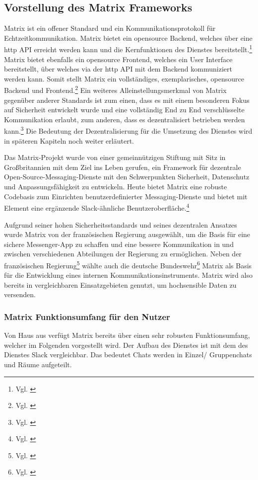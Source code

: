 \subsection{Vorstellung des Matrix Frameworks}\label{chapter:vdmf}
Matrix ist ein offener Standard und ein Kommunikationsprotokoll für  Echtzeitkommunikation. Matrix bietet ein opensource Backend, welches über eine http API erreicht werden kann und die Kernfunktionen des Dienstes bereitstellt.\footnote{Vgl. \cite{Matrix.org2020}} Matrix bietet ebenfalls ein opensource Frontend, welches ein User Interface bereitstellt, über welches via der http API mit dem Backend kommuniziert werden kann. Somit stellt Matrix ein vollständiges, exemplarisches, opensource Backend und Frontend.\footnote{Vgl. \cite{Github2020}} 
Ein weiteres Alleinstellungsmerkmal von Matrix gegenüber anderer Standards ist zum einen, dass es mit einem besonderen Fokus auf Sicherheit entwickelt wurde und eine vollständig End zu End verschlüsselte Kommunikation  erlaubt, zum anderen, dass es dezentralisiert betrieben werden kann.\footnote{Vgl. \cite{Nccgroup2016}} Die Bedeutung der Dezentralisierung für die Umsetzung des Dienstes wird in späteren Kapiteln noch weiter erläutert.

Das Matrix-Projekt wurde von einer gemeinnützigen Stiftung mit Sitz in Großbritannien mit dem Ziel ins Leben gerufen, ein Framework für dezentrale Open-Source-Messaging-Dienste mit den Schwerpunkten Sicherheit, Datenschutz und Anpassungsfähigkeit zu entwickeln. Heute bietet Matrix eine robuste Codebasis zum Einrichten benutzerdefinierter Messaging-Dienste und bietet mit Element eine ergänzende Slack-ähnliche Benutzeroberfläche.\footnote{Vgl. \cite{Matrix.org2020}}

Aufgrund seiner hohen Sicherheitsstandards und seines dezentralen Ansatzes wurde Matrix  von der französischen Regierung ausgewählt, um die Basis für eine sichere Messenger-App zu schaffen und eine bessere Kommunikation in und zwischen verschiedenen Abteilungen der Regierung zu ermöglichen. Neben der französischen Regierung\footnote{Vgl. \cite{Republique-Francaise2018}} wählte auch die deutsche Bundeswehr\footnote{Vgl. \cite{Weiss2020}} Matrix als Basis für die Entwicklung eines internen Kommunikationsinstruments. Matrix wird also bereits in vergleichbaren Einsatzgebieten genutzt, um hochsensible Daten zu versenden.

\subsubsection{Matrix Funktionsumfang für den Nutzer}\label{chapter:aemn}
Von Haus aus verfügt Matrix bereits über einen sehr robusten Funktionsumfang, welcher im Folgenden vorgestellt wird.
Der Aufbau des Dienstes ist mit dem des Dienstes Slack vergleichbar. Das bedeutet Chats werden in Einzel/ Gruppenchats und Räume aufgeteilt. 

